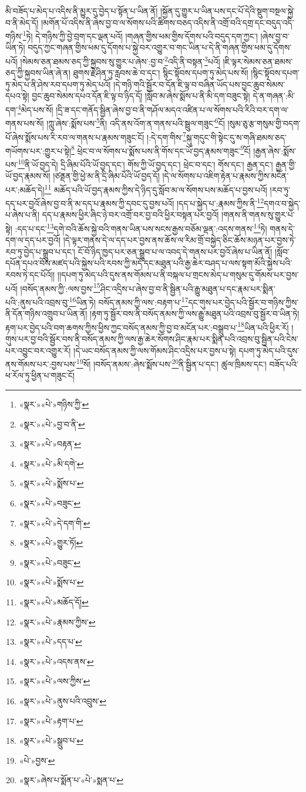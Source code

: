 མི་བཟོད་པ་མེད་པ་འདིས་ནི་མྱུར་དུ་བྱེད་པ་སྟོན་པ་ཡིན་ནོ། །སྐྱོན་དུ་གྱུར་པ་ཡིན་པས་དང་པོ་དེའི་སྡུག་བསྔལ་སྐྱེ་བ་ནི་མེད་དོ། །མགོན་པོ་འདིས་ནི་ཞེས་བྱ་བ་ལ་སོགས་པའི་ཚིགས་བཅད་འདིས་ནི་འགྲོ་བའི་དགྲ་དང་བདུད་འདི་གཉིས་\footnote{«སྣར་»«པེ་»གཉིས་ཀྱི་}ཏེ། དེ་གཉིས་ཀྱི་བྱེ་བྲག་དང་ལྡན་པའོ། །གཞན་གྱིས་ཕམ་གྱིས་དོགས་པའི་བདུད་དག་ཀྱང་། །ཞེས་བྱ་བ་ཡིན་ཏེ། བདུད་ཀྱང་གཞན་གྱིས་ཕམ་དུ་དོགས་པ་སྐྱེ་བར་འགྱུར་བ་གང་ཡིན་པ་དེ་ནི་གཞན་གྱིས་ཕམ་དུ་དོགས་པའོ། །སེམས་ཅན་ཐམས་ཅད་ཀྱི་སྐྱབས་སུ་གྱུར་པ་ཞེས་:བྱ་བ་\footnote{«སྣར་»«པེ་»བྱ་བ་ནི་}འདི་ནི་བསྟན་\footnote{«སྣར་»«པེ་»བརྟན་}པའོ། །ཇི་ལྟར་སེམས་ཅན་ཐམས་ཅད་ཀྱི་སྐྱབས་ཡིན་ཞེ་ན། ཐུགས་རྗེ་ཤིན་ཏུ་རླབས་ཆེ་བ་དང་། སྙིང་སྟོབས་དཔག་ཏུ་མེད་པས་སོ། །སྙིང་སྟོབས་དཔག་ཏུ་མེད་པ་ནི་ཤེས་རབ་དཔག་ཏུ་མེད་པའོ། །དེ་གཉི་གའི་སྦྱོར་བ་དོན་ཇི་ལྟ་བ་བཞིན་ཡོད་པས་བྱང་ཆུབ་སེམས་དཔའ་སྟེ། བྱང་ཆུབ་སེམས་དཔའ་དོན་ཇི་ལྟ་བ་ཉིད་དོ། །སློབ་མ་ཞེས་སྨོས་པ་ནི་མི་དག་བཟུང་སྟེ། དེ་ན་གཞན་:མི་དག་\footnote{«སྣར་»«པེ་»མི་དགེ་}མེད་པས་སོ། །དྲི་ཟ་དང་གནོད་སྦྱིན་ཞེས་བྱ་བ་ནི་གཤོལ་མདའ་འཛིན་པ་ལ་སོགས་པའི་རིའི་བར་དག་ལ་གནས་པས་སོ། །ཀླུ་ཞེས་:སྨོས་པས་\footnote{«སྣར་»«པེ་»སྨོས་པ་}ནི། འདི་ནས་འོག་ན་གནས་པའི་སྦྲུལ་གཟུང་\footnote{«སྣར་»«པེ་»བཟུང་}ངོ། །སུམ་ཅུ་རྩ་གསུམ་གྱི་བདག་པོ་ཞེས་སྨོས་པས་རི་རབ་ལ་གནས་པ་རྣམས་གཟུང་ངོ། །:དེ་དག་གིས་\footnote{«སྣར་»«པེ་»དེ་དག་གི་}སྐུ་གདུང་གི་སྟེང་དུ་ས་གཞི་ཐམས་ཅད་གཡོགས་པར་:གྱུར་པ་སྟེ།\footnote{«སྣར་»«པེ་»གྱུར་ཏོ།} ཕྲེང་བ་ལ་སོགས་པ་སྨོས་པས་ནི་གོས་དང་ཡོ་བྱད་རྣམས་གཟུང་\footnote{«སྣར་»«པེ་»བཟུང་}ངོ། །རྒྱན་ཞེས་:སྨོས་པས་\footnote{«སྣར་»«པེ་»སྨོས་པ་}ནི་ཡོ་བྱད་དེ། དྲི་ཞིམ་པོའི་ཡོ་བྱད་དང་། གོས་ཀྱི་ཡོ་བྱད་དང་། ཕྲེང་བ་དང་། གོས་དང་། རྒྱན་དང་། རྒྱན་གྱི་ཡོ་བྱད་རྣམས་སོ། །ཙནྡན་གྱི་ཕྱེ་མ་ནི་དྲི་ཞིམ་པོའི་ཡོ་བྱད་དོ། །དེ་ལ་སོགས་པ་འཇིག་རྟེན་པ་རྣམས་ཀྱིས་མངོན་པར་:མཆོད་དེ།\footnote{«སྣར་»«པེ་»མཆོད་དོ།} མཆོད་པའི་ཡོ་བྱད་རྣམས་ཀྱིས་དེ་ཉིད་དུ་སློབ་མ་ལ་སོགས་པས་མཆོད་པ་བྱས་པའོ། །རབ་ཏུ་དད་པར་བྱའོ་ཞེས་བྱ་བ་ནི་མ་དད་པ་རྣམས་ཀྱི་དབང་དུ་བྱས་པའོ། །དད་པ་སྐྱེད་པ་:རྣམས་ཀྱིས་ནི་\footnote{«སྣར་»«པེ་»རྣམས་ཀྱིས་}དགའ་བ་སྐྱེད་པ་ཞེས་པ་ནི། དད་པ་རྣམས་ཕྱིར་ཞིང་ཉེ་བར་འགྲོ་བར་བྱ་བའི་ཕྱིར་བསྟན་པར་བྱའོ། །གནས་ནི་གནས་སུ་གྱུར་པ་སྟེ། :དད་པ་དང་\footnote{«སྣར་»«པེ་»དད་པ་}དགེ་བའི་ཆོས་སྐྱེ་བའི་གནས་ཡིན་པས་སངས་རྒྱས་བཅོམ་ལྡན་:འདས་གནས་\footnote{«སྣར་»«པེ་»འདས་ནས་}ཏེ། གནས་དེ་དག་ལ་དད་པར་བྱའོ། །དེ་ལྟར་གནས་དེ་ལ་དད་པར་བྱས་ནས་ཆོས་ལ་རིམ་གྲོ་བསྐྱེད་ཅིང་ཆོས་མཉན་པར་བྱས་ཏེ་རབ་ཏུ་བྱེད་པ་སྒྲུབ་པ་དང་། ངོ་བོ་ཉིད་ཁྱད་པར་ཅན་སྒྲུབ་པ་ལ་འབད་དེ་གནས་པར་བྱའོ་ཞེས་པ་ཡིན་ནོ། །སློབ་དཔོན་དཔའ་བོས་མཛད་པའི་སྐྱེས་པའི་རབས་ཀྱི་མདོ་དང་མཐུན་པའི་རྒྱ་ཆེར་བཤད་པ་ལས་སྟག་མོའི་སྐྱེས་པའི་རབས་ཏེ་དང་པོའོ།། །།དཔག་ཏུ་མེད་པའི་དུས་ནས་གོམས་པ་ནི་བསྐལ་པ་གྲངས་མེད་པ་གསུམ་དུ་གོམས་པར་བྱས་པའོ། །བསོད་ནམས་ཀྱི་:ལས་བྱས་\footnote{«སྣར་»«པེ་»ལས་ཀྱིས་}ཤིང་འདྲིས་པ་ཞེས་བྱ་བ་ནི་སྦྱིན་པའི་རྒྱུ་མཐུན་པ་དང་རྣམ་པར་སྨིན་པའི་:ནུས་པའི་འབྲས་བུ་\footnote{«སྣར་»«པེ་»ནུས་པའི་འབྲུས་}ཡིན་ཏེ། བསོད་ནམས་ཀྱི་ལས་:བརྟག་པ་\footnote{«སྣར་»«པེ་»རྟག་པ་}དང་གུས་པར་བྱེད་པའི་སྦྱོར་བ་གཉིས་ཀྱིས་ནི་དོན་གཉིས་འགྲུབ་པ་ཡིན་ནོ། །རྟག་ཏུ་སྦྱོར་བས་ནི་བསོད་ནམས་ཀྱི་ལས་རྒྱུ་མཐུན་པའི་འབྲས་བུ་སྦྱོར་བ་ཡིན་ཏེ། རྟག་པར་བྱེད་པའི་བག་ཆགས་ཀྱིས་ཕྱིས་ཀྱང་བསོད་ནམས་ཀྱི་བྱ་བ་མངོན་པར་:བསྒྲུབ་པ་\footnote{«སྣར་»«པེ་»སྒྲུབ་པ་}ཡིན་པའི་ཕྱིར་རོ། །གུས་པར་བྱ་བའི་སྦྱོར་བས་ནི་བསོད་ནམས་ཀྱི་ལས་རྒྱ་ཆེར་སོགས་ཤིང་རྣམ་པར་སྨིན་པའི་འབྲས་བུ་སྦྱིན་པའི་ངེས་པར་འབྱུང་བར་འགྱུར་རོ། །དེ་ཡང་བསོད་ནམས་ཀྱི་ལས་གོམས་ཤིང་འདྲིས་པར་བྱས་པ་སྟེ། དཔག་ཏུ་མེད་པའི་དུས་ནས་གོམས་པར་:བྱས་པས་\footnote{«པེ་»བྱས་}སོ། །བསོད་ནམས་:ཞེས་སྨོས་པས་\footnote{«སྣར་»ཞེས་པ་སྨོན་པ་«པེ་»སྨན་པ་}ནི་སྦྱིན་པ་དང་། ཚུལ་ཁྲིམས་དང་། བཟོད་པའི་ཕ་རོལ་ཏུ་ཕྱིན་པ་གཟུང་ངོ། 